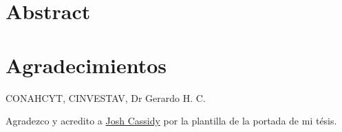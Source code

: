 \documentclass[12pt, a4paper, twoside, openright, final]{book}
\begin{document}


\newpage
\thispagestyle{empty}

\frontmatter


\chapter*{Abstract}
\label{ch: abstract}

\newpage
\thispagestyle{empty}

\chapter*{Agradecimientos}
\label{ch: Agradecimientos}
\begin{flushright}
CONAHCYT, CINVESTAV, Dr Gerardo H. C.

Agradezco y acredito a \href{https://www.overleaf.com/learn/latex/How_to_Write_a_Thesis_in_LaTeX_(Part_1)%3A_Basic_Structure}{Josh Cassidy} por la plantilla de la portada de mi tésis.
\end{flushright}

\newpage
\thispagestyle{empty}

\renewcommand{\contentsname}{Contenido}
\tableofcontents %
\renewcommand{\listfigurename}{Lista de figuras}
\listoffigures

\newpage
\thispagestyle{empty}
\renewcommand{\listtablename}{Lista de Tablas}
\listoftables

\newpage
\thispagestyle{empty}

\mainmatter
\end{document}
